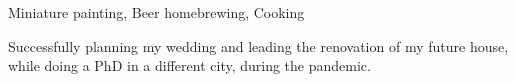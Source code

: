 \documentclass[10pt,a4paper,ragged2e]{altacv}
\begin{document}
Miniature painting, Beer homebrewing, Cooking

\smallskip
Successfully planning my wedding and leading the renovation of my future house, while doing a PhD in a different city, during the pandemic.

\clearpage

\begin{fullwidth}


  \printbibliography[heading=pubtype,title=\empty, type=misc]


  \nocite{*}

  \printbibliography[heading=pubtype,title={\printinfo{\faFileTextO}{Journal}}, type=article]

  \divider

  \printbibliography[heading=pubtype,title={\printinfo{\faFileTextO}{Conference Proceedings}}, type=inproceedings]

\end{fullwidth}
\end{document}
